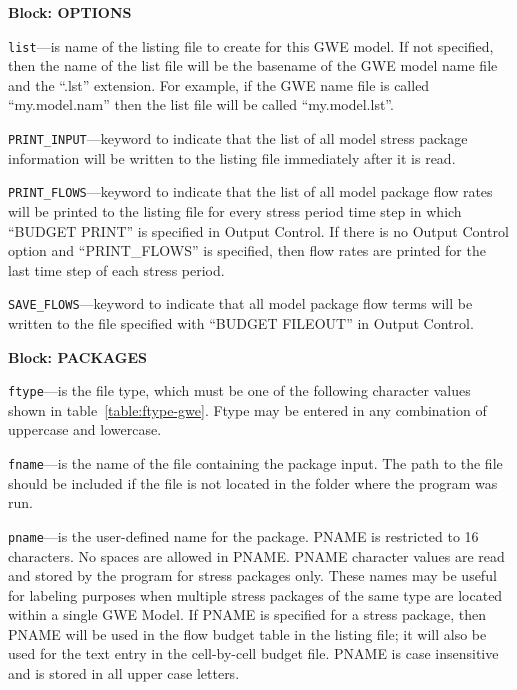 
\item \textbf{Block: OPTIONS}

\begin{description}
\item \texttt{list}---is name of the listing file to create for this GWE model.  If not specified, then the name of the list file will be the basename of the GWE model name file and the ``.lst'' extension.  For example, if the GWE name file is called ``my.model.nam'' then the list file will be called ``my.model.lst''.

\item \texttt{PRINT\_INPUT}---keyword to indicate that the list of all model stress package information will be written to the listing file immediately after it is read.

\item \texttt{PRINT\_FLOWS}---keyword to indicate that the list of all model package flow rates will be printed to the listing file for every stress period time step in which ``BUDGET PRINT'' is specified in Output Control.  If there is no Output Control option and ``PRINT\_FLOWS'' is specified, then flow rates are printed for the last time step of each stress period.

\item \texttt{SAVE\_FLOWS}---keyword to indicate that all model package flow terms will be written to the file specified with ``BUDGET FILEOUT'' in Output Control.

\end{description}
\item \textbf{Block: PACKAGES}

\begin{description}
\item \texttt{ftype}---is the file type, which must be one of the following character values shown in table~\ref{table:ftype-gwe}. Ftype may be entered in any combination of uppercase and lowercase.

\item \texttt{fname}---is the name of the file containing the package input.  The path to the file should be included if the file is not located in the folder where the program was run.

\item \texttt{pname}---is the user-defined name for the package. PNAME is restricted to 16 characters.  No spaces are allowed in PNAME.  PNAME character values are read and stored by the program for stress packages only.  These names may be useful for labeling purposes when multiple stress packages of the same type are located within a single GWE Model.  If PNAME is specified for a stress package, then PNAME will be used in the flow budget table in the listing file; it will also be used for the text entry in the cell-by-cell budget file.  PNAME is case insensitive and is stored in all upper case letters.

\end{description}

